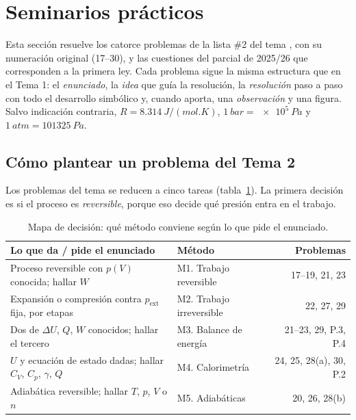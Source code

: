 \section{Seminarios prácticos}
Esta sección resuelve los catorce problemas de la lista \#2 del tema \cite{gonzalez1}, con su numeración
original (17--30), y las cuestiones del parcial de 2025/26 \cite{parcial} que corresponden a la primera
ley. Cada problema sigue la misma estructura que en el Tema 1: el \emph{enunciado}, la \emph{idea} que guía la
resolución, la \emph{resolución} paso a paso con todo el desarrollo simbólico y, cuando aporta, una
\emph{observación} y una figura. Salvo indicación contraria, $R=\SI{8,314}{J/(mol.K)}$,
$\SI{1}{bar}=\SI{e5}{Pa}$ y $\SI{1}{atm}=\SI{101325}{Pa}$.

\subsection{Cómo plantear un problema del Tema 2}

Los problemas del tema se reducen a cinco tareas (tabla~\ref{tab:metodos}). La primera decisión es si el
proceso es \emph{reversible}, porque eso decide qué presión entra en el trabajo.

\begin{table}[htbp]
\centering
\caption{Mapa de decisión: qué método conviene según lo que pide el enunciado.}
\label{tab:metodos}
\small
\begin{tabularx}{\textwidth}{Xlr}
\toprule
Lo que da / pide el enunciado & Método & Problemas\\
\midrule
Proceso reversible con $p(V)$ conocida; hallar $W$ & M1. Trabajo reversible & 17--19, 21, 23\\
Expansión o compresión contra $p_{\mathrm{ext}}$ fija, por etapas & M2. Trabajo irreversible & 22, 27, 29\\
Dos de $\Delta U$, $Q$, $W$ conocidos; hallar el tercero & M3. Balance de energía & 21--23, 29, P.3, P.4\\
$U$ y ecuación de estado dadas; hallar $C_V$, $C_p$, $\gamma$, $Q$ & M4. Calorimetría & 24, 25, 28(a), 30, P.2\\
Adiabática reversible; hallar $T$, $p$, $V$ o $n$ & M5. Adiabáticas & 20, 26, 28(b)\\
\bottomrule
\end{tabularx}
\end{table}

